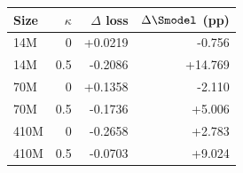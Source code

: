 \begin{tabular}{@{}lrrr@{}}
\toprule
Size & $\kappa$ & $\Delta$ loss & $\Delta\Smodel$ (pp) \\
\midrule
14M & 0 & +0.0219 & -0.756 \\
14M & 0.5 & -0.2086 & +14.769 \\
70M & 0 & +0.1358 & -2.110 \\
70M & 0.5 & -0.1736 & +5.006 \\
410M & 0 & -0.2658 & +2.783 \\
410M & 0.5 & -0.0703 & +9.024 \\
\bottomrule
\end{tabular}
